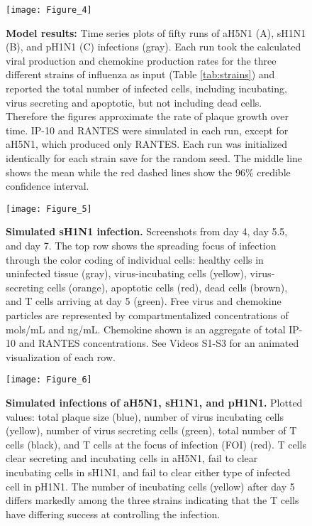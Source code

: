 \documentclass[10pt]{article}
\begin{document}
\begin{figure}[ht!]
\begin{center}
\texttt{[image: Figure\_4]}
 \end{center}
\caption{\textbf{Model results:} Time series plots of fifty runs of aH5N1 (A), sH1N1 (B), and pH1N1 (C) infections (gray). Each run took the calculated viral production and chemokine production rates for the three different strains of influenza as input (Table \ref{tab:strains}) and reported the total number of infected cells, including incubating, virus secreting and apoptotic, but not including dead cells.  Therefore the figures approximate the rate of plaque growth over time.  IP-10 and RANTES were simulated in each run, except for aH5N1, which  produced only RANTES.  Each run was initialized identically for each strain save for the random seed.  The middle line shows the mean while the red dashed lines show the 96\% credible confidence interval.} 
 \label{fig:variance}
\end{figure}

\begin{figure}[!ht]
\begin{center}
\texttt{[image: Figure\_5]}
 \end{center}
\caption{{\bf Simulated sH1N1 infection.} Screenshots from day 4, day 5.5, and day 7.  The top row shows the spreading focus of infection  through the color coding of individual cells:  healthy cells in uninfected tissue (gray),  virus-incubating cells (yellow), virus-secreting cells (orange), apoptotic cells (red), dead cells (brown), and T cells arriving at day 5 (green).  Free virus and chemokine particles are represented by compartmentalized concentrations of mols/mL and ng/mL.  Chemokine shown is an aggregate of total IP-10 and RANTES concentrations.  See Videos S1-S3 for an animated visualization of each row.} 
 \label{fig:cycells}
\end{figure}


\begin{figure}[!ht]
\begin{center}
\texttt{[image: Figure\_6]}
 \end{center}
\caption{{\bf Simulated infections of aH5N1, sH1N1, and pH1N1.} Plotted values: total plaque size (blue), number of virus incubating cells (yellow), number of virus secreting cells (green), total number of T cells (black), and T cells at the focus of infection (FOI) (red).  T cells clear secreting and incubating cells in aH5N1, fail to clear incubating cells in sH1N1, and fail to clear either type of infected cell in pH1N1.  The number of incubating cells (yellow) after day 5 differs markedly among the three strains indicating that the T cells have differing success at controlling the infection.} 
 \label{fig:plaquesize}
\end{figure}
\end{document}
